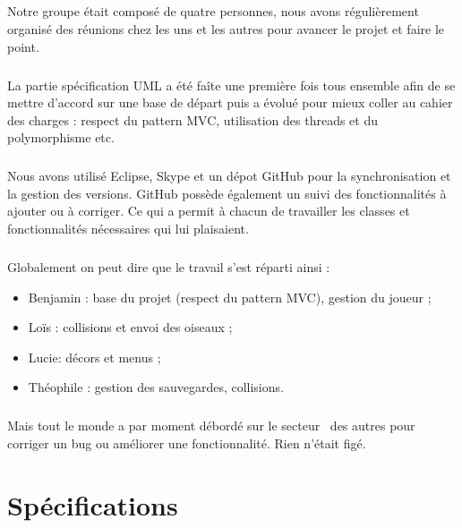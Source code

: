 \documentclass[a4paper,12pt]{report}
\begin{document}
\paragraph{}Notre groupe était composé de quatre personnes, nous avons régulièrement organisé des réunions chez les uns et les autres pour avancer le projet et faire le point.

\paragraph{}La partie spécification UML a été faîte une première fois tous ensemble afin de se mettre d'accord sur une base de départ puis a évolué pour mieux coller au cahier des charges : respect du pattern MVC, utilisation des threads et du polymorphisme etc.

\paragraph{}Nous avons utilisé Eclipse, Skype et un dépot GitHub pour la synchronisation et la gestion des versions. GitHub possède également un suivi des fonctionnalités à ajouter ou à corriger. Ce qui a permit à chacun de travailler les classes et fonctionnalités nécessaires qui lui plaisaient.

\paragraph{}Globalement on peut dire que le travail s'est réparti ainsi :
\begin{itemize}
\item Benjamin  : base du projet (respect du pattern MVC), gestion du joueur ;
\item Loïs : collisions et envoi des oiseaux ;
\item Lucie: décors et menus ;
\item Théophile : gestion des sauvegardes, collisions.
\end{itemize}

\paragraph{}Mais tout le monde a par moment débordé sur le \guillemotleft secteur\guillemotright~ des autres pour corriger un bug ou améliorer une fonctionnalité. Rien n'était figé.

\chapter{Spécifications}
\end{document}
